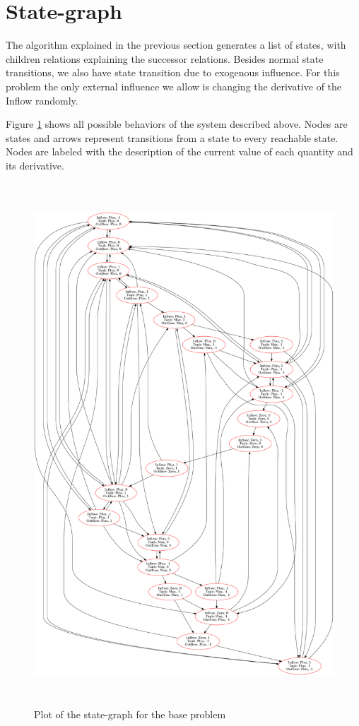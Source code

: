 \documentclass[a4paper]{article}
\begin{document}
\section{State-graph}
The algorithm explained in the previous section generates a list of states, with children relations explaining the successor relations. Besides normal state transitions, we also have state transition due to exogenous influence. For this problem the only external influence we allow is changing the derivative of the Inflow randomly.

Figure \ref{fig:state_graph_base} shows all possible behaviors of the system described above. Nodes are states and arrows represent transitions from a state to every reachable state. Nodes are labeled with the description of the current value of each quantity and its derivative.

\begin{figure}[H]
\centering
\includegraphics[width=\textwidth,height=7.7in,keepaspectratio]{result_base_problem.png}
\caption{Plot of the state-graph for the base problem}
\label{fig:state_graph_base}
\end{figure}
\end{document}
